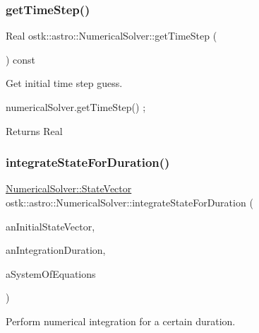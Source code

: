 \subsubsection{\texorpdfstring{get\+Time\+Step()}{getTimeStep()}}
{\footnotesize\ttfamily Real ostk\+::astro\+::\+Numerical\+Solver\+::get\+Time\+Step (\begin{DoxyParamCaption}{ }\end{DoxyParamCaption}) const}



Get initial time step guess. 


\begin{DoxyCode}
numericalSolver.getTimeStep() ;
\end{DoxyCode}


\begin{DoxyReturn}{Returns}
Real 
\end{DoxyReturn}
\mbox{\label{classostk_1_1astro_1_1_numerical_solver_a759c48ef757547a6855c21795c66ec5a}} 
\subsubsection{\texorpdfstring{integrate\+State\+For\+Duration()}{integrateStateForDuration()}}
{\footnotesize\ttfamily \hyperlink{classostk_1_1astro_1_1_numerical_solver_a4a1673a6f74a72d6bacfe6480b9c1ccd}{Numerical\+Solver\+::\+State\+Vector} ostk\+::astro\+::\+Numerical\+Solver\+::integrate\+State\+For\+Duration (\begin{DoxyParamCaption}\item[{const \hyperlink{classostk_1_1astro_1_1_numerical_solver_a4a1673a6f74a72d6bacfe6480b9c1ccd}{State\+Vector} \&}]{an\+Initial\+State\+Vector,  }\item[{const Duration \&}]{an\+Integration\+Duration,  }\item[{const \hyperlink{classostk_1_1astro_1_1_numerical_solver_aa39593aa5ff747e4f68492708b45bbc5}{System\+Of\+Equations\+Wrapper} \&}]{a\+System\+Of\+Equations }\end{DoxyParamCaption})}



Perform numerical integration for a certain duration. 


